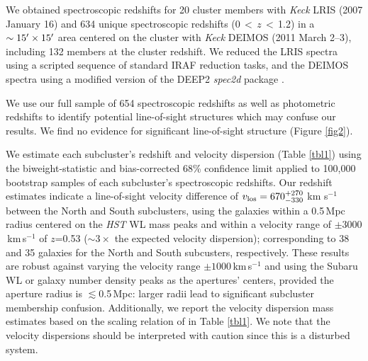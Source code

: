 We obtained spectroscopic redshifts for 20 cluster members with {\it Keck} LRIS (2007 January 16) and 634 unique spectroscopic redshifts (0\,$<$\,$z$\,$<$\,1.2)  in a $\sim15\mbox{$^\prime$}\times 15\mbox{$^\prime$}$ area centered on the cluster with {\it Keck} DEIMOS (2011 March 2--3), including 132 members at the cluster redshift.
We reduced the LRIS spectra using a scripted sequence of standard IRAF reduction tasks, and the DEIMOS spectra using a modified version of the DEEP2 \emph{spec2d} package \citep{Davis:2003fe,Gal:2008bg,Lemaux:2009fy}.

We use our full sample of 654 spectroscopic redshifts as well as photometric redshifts to identify potential line-of-sight structures which may confuse our results.
We find no evidence for significant line-of-sight structure (Figure \ref{fig2}).

We estimate each subcluster's redshift and velocity dispersion (Table \ref{tbl1}) using the biweight-statistic and bias-corrected 68\% confidence limit \citep{Beers:1990kg} applied to 100,000 bootstrap samples of each subcluster's spectroscopic redshifts.
Our redshift estimates indicate a line-of-sight velocity difference of $v_{\rm los}=670^{+270}_{-330}$ km s$^{-1}$ between the North and South subclusters, using the galaxies within a 0.5\,Mpc radius centered on the {\it HST} WL mass peaks and within a velocity range of $\pm 3000$\,km\,s$^{-1}$ of $z$=0.53 ($\sim3\times$ the expected velocity dispersion); corresponding to 38 and 35 galaxies for the North and South subcusters, respectively.
These results are robust against varying the velocity range $\pm1000$\,km\,s$^{-1}$ and using the Subaru WL or galaxy number density peaks as the apertures' centers, provided the aperture radius is $\lesssim$0.5\,Mpc: larger radii lead to significant subcluster membership confusion.
Additionally, we report the velocity dispersion mass estimates based on the scaling relation of \citet{Evrard:2008jm} in Table \ref{tbl1}.
We note that the velocity dispersions should be interpreted with caution since this is a disturbed system.

